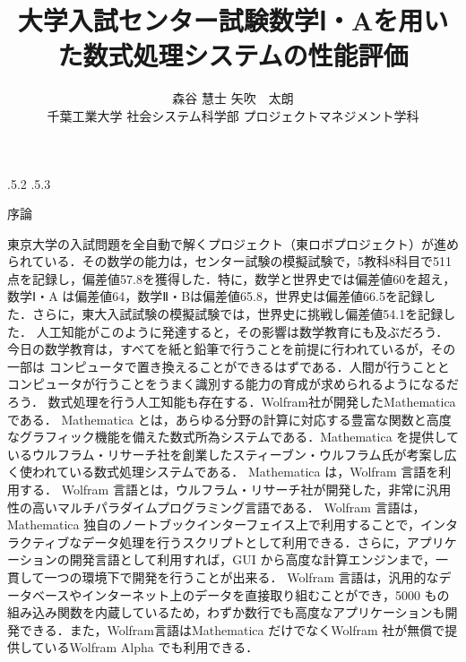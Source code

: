 \documentclass[uplatex,twocolumn]{jsarticle}
\title{\vspace{-10mm}大学入試センター試験数学Ⅰ・Aを用いた数式処理システムの性能評価 \footnotemark[0]}
\author{森谷 慧士 \footnotemark[2]\qquad 矢吹　太朗  \\ 千葉工業大学 社会システム科学部 プロジェクトマネジメント学科\footnotemark[2]}
\date{}%
\makeatletter
\renewcommand{\section}{%
    \if@slide\clearpage\fi
    \@startsection{section}{1}{\z@}%
    {\Cvs \@plus.5\Cdp \@minus.2\Cdp}%
    {.5\Cvs \@plus.3\Cdp}%
    {\normalfont\raggedright}}
\makeatother
\begin{document}
\twocolumn[\maketitle]

\begingroup
\def\thefootnote{\fnsymbol{footnote}}
\endgroup




\section{序論}


 
東京大学の入試問題を全自動で解くプロジェクト（東ロボプロジェクト）が進められている\cite{arai2014}．その数学の能力は，センター試験の模擬試験で，5教科8科目で511点を記録し，偏差値57.8を獲得した．特に，数学と世界史では偏差値60を超え，数学Ⅰ・A は偏差値64，数学Ⅱ・Bは偏差値65.8，世界史は偏差値66.5を記録した．さらに，東大入試試験の模擬試験では，世界史に挑戦し偏差値54.1を記録した\cite{tourobo}．
人工知能がこのように発達すると，その影響は数学教育にも及ぶだろう．今日の数学教育は，すべてを紙と鉛筆で行うことを前提に行われているが，その一部は コンピュータで置き換えることができるはずである．人間が行うこととコンピュータが行うことをうまく識別する能力の育成が求められるようになるだろう．
数式処理を行う人工知能も存在する．Wolfram社が開発したMathematicaである．
Mathematica とは，あらゆる分野の計算に対応する豊富な関数と高度なグラフィック機能を備えた数式所為システムである．Mathematica を提供しているウルフラム・リサーチ社を創業したスティーブン・ウルフラム氏が考案し広く使われている数式処理システムである\cite{wolfram2014}．
Mathematica は，Wolfram 言語を利用する．
Wolfram 言語とは，ウルフラム・リサーチ社が開発した，非常に汎用性の高いマルチパラダイムプログラミング言語である．
Wolfram 言語は，Mathematica 独自のノートブックインターフェイス上で利用することで，インタラクティブなデータ処理を行うスクリプトとして利用できる．さらに，アプリケーションの開発言語として利用すれば，GUI から高度な計算エンジンまで，一貫して一つの環境下で開発を行うことが出来る．
Wolfram 言語は，汎用的なデータベースやインターネット上のデータを直接取り組むことができ，5000 もの組み込み関数を内蔵しているため，わずか数行でも高度なアプリケーションも開発できる．また，Wolfram言語はMathematica だけでなくWolfram 社が無償で提供しているWolfram Alpha でも利用できる\cite{mitubisi}．
\end{document}
